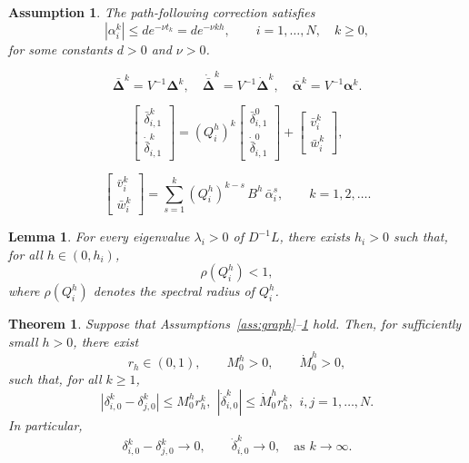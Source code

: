 \documentclass[10pt,a4paper]{amsart}
\newtheorem{assumption}{Assumption}
\newtheorem{lemma}{Lemma}
\newtheorem{theorem}{Theorem}
\begin{document}
\begin{assumption}\label{ass:tracking}
The path-following correction satisfies
\[
|\alpha_i^k|\le d e^{-\nu t_k}=d e^{-\nu kh},
\qquad i=1,\dots,N,\quad k\ge 0,
\]
for some constants \(d>0\) and \(\nu>0\).
\end{assumption}

\begin{equation}\label{varsub}
\bar{\bm{\Delta}}^k = V^{-1}\bm{\Delta}^k,
\quad
\dot{\bar{\bm{\Delta}}}^k = V^{-1}\dot{\bm{\Delta}}^k,
\quad
\bar{\bm{\alpha}}^k = V^{-1}\bm{\alpha}^k .
\end{equation}

\begin{equation}\label{state5}
\begin{bmatrix}
\bar{\delta}_{i,1}^k \\[5pt]
\dot{\bar{\delta}}_{i,1}^k
\end{bmatrix}
=
(Q^{h}_{i})^k
\begin{bmatrix}
\bar{\delta}_{i,1}^{0} \\[5pt]
\dot{\bar{\delta}}_{i,1}^{0}
\end{bmatrix}
+
\begin{bmatrix}
\bar{v}_i^k \\[5pt]
\bar{w}_i^k
\end{bmatrix},
\end{equation}

\begin{equation}\label{vk_def}
\begin{bmatrix}
\bar{v}_i^k \\[5pt]
\bar{w}_i^k
\end{bmatrix}
=
\sum_{s=1}^{k}
(Q_i^h)^{k-s}\, B^h\, \bar{\alpha}_i^{s},
\qquad k=1,2,\dots .
\end{equation}

\begin{lemma}\label{lemma:rho}
For every eigenvalue \(\lambda_i>0\) of \(D^{-1}L\), there exists \(h_i>0\) such that, for all
\(h\in(0,h_i)\),
\[
\rho(Q_i^h)<1,
\]
where \(\rho(Q_i^h)\) denotes the spectral radius of \(Q_i^h\).
\end{lemma}

\begin{theorem}\label{theorem-unconstraint}
Suppose that Assumptions~\ref{ass:graph}--\ref{ass:tracking} hold. Then, for sufficiently small \(h>0\), there exist
\[
r_h\in(0,1),\qquad M_0^h>0,\qquad \dot M_0^h>0,
\]
such that, for all \(k\ge 1\),
\begin{equation}\label{eq:teo1}
    |\delta_{i,0}^k-\delta_{j,0}^k|
\le M_0^h r_h^k,
\,\ |\dot{\delta}_{i,0}^{k}|
\le \dot M_0^h r_h^k,\,\ i,j=1,\dots,N.
\end{equation}
In particular,
\[
\delta_{i,0}^k-\delta_{j,0}^k\to 0,
\qquad
\dot{\delta}_{i,0}^k\to 0,
\quad \text{as } k\to\infty.
\]
\end{theorem}
\end{document}
